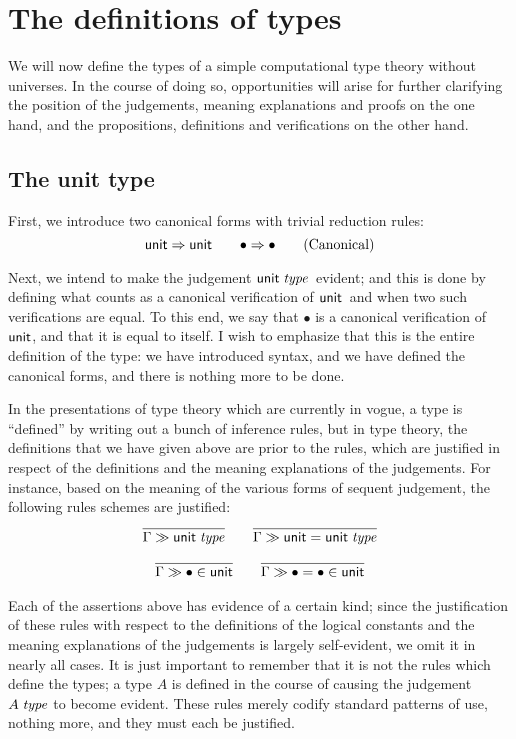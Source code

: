 \documentclass[main.tex]{subfiles}
\begin{document}
\section{The definitions of types}

We will now define the types of a simple computational type theory without
universes. In the course of doing so, opportunities will arise for further
clarifying the position of the judgements, meaning explanations and proofs on
the one hand, and the propositions, definitions and verifications on the other
hand.

\subsection{The unit type}

First, we introduce two canonical forms with trivial reduction rules:
\begin{equation}
  \mathsf{unit}\Rightarrow\mathsf{unit}\qquad
  \bullet\Rightarrow\bullet
  \tag{Canonical}
\end{equation}

Next, we intend to make the judgement $\mathsf{unit}\;\mathit{type}$\ evident; and this is done by
defining what counts as a canonical verification of $\mathsf{unit}$\ and when two such
verifications are equal. To this end, we say that $\bullet$ is a canonical
verification of $\mathsf{unit}$, and that it is equal to itself.  I wish to emphasize
that this is the entire definition of the type: we have introduced syntax, and
we have defined the canonical forms, and there is nothing more to be done.

In the presentations of type theory which are currently in vogue, a type is
``defined'' by writing out a bunch of inference rules, but in type theory, the
definitions that we have given above are prior to the rules, which are
justified in respect of the definitions and the meaning explanations of the
judgements. For instance, based on the meaning of the various forms of sequent
judgement, the following rules schemes are justified:
\begin{gather*}
  \infer{
    \sequent\Gamma\isset\tyunit
  }{
  }\qquad
  \infer{
    \sequent\Gamma\isset{\tyunit=\tyunit}
  }{
  }\\[6pt]
  \infer{
    \sequent\Gamma\ver\bullet\tyunit
  }{
  }\qquad
  \infer{
    \sequent\Gamma\ver{\bullet=\bullet}{\tyunit}
  }{
  }
\end{gather*}

Each of the assertions above has evidence of a certain kind; since the
justification of these rules with respect to the definitions of the logical
constants and the meaning explanations of the judgements is largely
self-evident, we omit it in nearly all cases. It is just important to remember
that it is not the rules which define the types; a type $A$ is defined in the
course of causing the judgement $A\;\mathit{type}$ to become evident.  These rules
merely codify standard patterns of use, nothing more, and they must each be
justified.
\end{document}
